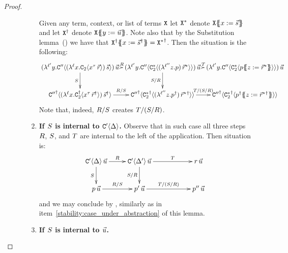 \begin{proof}
\begin{enumerate}
\begin{enumerate}
\begin{enumerate}
      Given any term, context, or list of terms $\mathtt{X}$ let $\mathtt{X}^*$ denote $\mathtt{X}\{\!\!\{x := \vec{s}\}\!\!\}$
      and let $\mathtt{X}^\dagger$ denote $\mathtt{X}\{\!\!\{y := \vec{u}\}\!\!\}$.
      Note also that by the Substitution lemma~() we have that
      $\mathtt{X}^\dagger\{\!\!\{x := \vec{s}^\dagger\}\!\!\} = {\mathtt{X}^*}^\dagger$.
      Then the situation is the following:
      {\footnotesize
      \[
        \xymatrix@C=.1cm{
          (\lamp{\labtwo}{\vartwo}{\con''\of{ (\lamp{\lab}{\var}{\con_2\of{\var^\typ\,\ls{\tmfour}}})\,\ls{\tmtwo} }})\,\ls{\tmthree}
          \ar[r]^-{\redex}
          \ar[d]_-{\redextwo}
        &
          (\lamp{\labtwo}{\vartwo}{\con''\of{ \con_2^*\of{(\lamp{\labthree}{\varthree}{\tmfive})\,\ls{\tmfour}^*}}})\,\ls{\tmthree}
          \ar[d]_-{\redextwo/\redex}
          \ar[r]^-{\redexthree}
        &
          (\lamp{\labtwo}{\vartwo}{\con''\of{ \con_2^*\of{  \tmfive\sub{\varthree}{\ls{\tmfour}^*} }}})\,\ls{\tmthree}
        \\
          {\con''}^\dagger\of{(\lamp{\lab}{\var}{\con_2^\dagger\of{\var^\typ\,\ls{\tmfour}^\dagger}})\,\ls{\tmtwo}^\dagger}
          \ar[r]^-{\redex/\redextwo}
        &
          {\con''}^\dagger\of{ {\con_2^*}^\dagger\of{(\lamp{\labthree}{\varthree}{\tmfive^\dagger})\,{\ls{\tmfour}^*}{}^\dagger} }
          \ar[r]^-{\redexthree/(\redextwo/\redex)}
        &
          {\con''}^\dagger\of{ {\con_2^*}^\dagger\of{  \tmfive^\dagger\sub{\varthree}{{\ls{\tmfour}^*}{}^\dagger} } }
        }
      \]}
      Note that, indeed, $R/S$ creates $T/(S/R)$.
    \item {\bf If $S$ is internal to $\mathtt{C}'\langle\Delta\rangle$.}
      Observe that in such case all three steps $R$, $S$, and $T$ are internal to the left 
      of the application. Then situation is:
      \[
        \xymatrix{
          \con'\of{\Delta}\,\ls{\tmthree}
          \ar[r]^-{\redex}
          \ar[d]_-{\redextwo}
        &
          \con'\of{\Delta'}\,\ls{\tmthree}
          \ar[d]_-{\redextwo/\redex}
          \ar[rr]^-{\redexthree}
        &&
          \tmfour\,\ls{\tmthree}
        \\
          \tmfive\,\ls{\tmthree}
          \ar[r]^-{\redex/\redextwo}
        &
          \tmfive'\,\ls{\tmthree}
          \ar[rr]^-{\redexthree/(\redextwo/\redex)}
        &&
          \tmfive''\,\ls{\tmthree}
        }
      \]
      and we may conclude by \ih, similarly as in item~\ref{stability:case_under_abstraction} of this lemma.
    \item {\bf If $S$ is internal to $\vec{u}$.}

\end{enumerate}
\end{enumerate}
\end{enumerate}
\end{proof}
